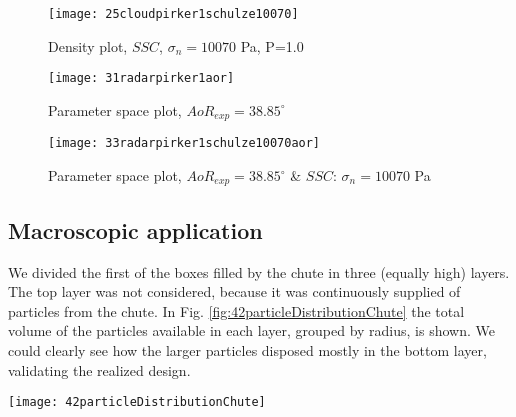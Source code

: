 \documentclass{CFD2015}
\begin{document}
\begin{figure}%
\centering 
\texttt{[image: 25cloudpirker1schulze10070]} 
\caption{Density plot, $SSC$, $\sigma_n=10070$ Pa, P=1.0}
\label{fig:25cloudpirker1schulze10070} 
\end{figure}
\begin{figure}%
\centering 
\texttt{[image: 31radarpirker1aor]} 
\caption{Parameter space plot, $AoR_{exp} = 38.85 ^\circ$}
\label{fig:31radarpirker1aor} 
\end{figure}
\begin{figure}%
\centering 
\texttt{[image: 33radarpirker1schulze10070aor]} 
\caption{Parameter space plot, $AoR_{exp} = 38.85
        ^\circ$ \& $SSC$: $\sigma_n=10070$ Pa}
\label{fig:33radarpirker1schulze10070aor} 
\end{figure}


\subsection{Macroscopic application}
\label{subsec:macroapplication}

We divided the first of the boxes filled by the chute in three (equally high)
layers.
The top layer was not considered, because it was continuously supplied of
particles from the chute.
In Fig. \ref{fig:42particleDistributionChute} the total volume of the particles
available in each layer, grouped by radius, is shown.
We could clearly see how the larger particles disposed mostly in the bottom
layer, validating the realized design.

\begin{figure*}%
\centering 
\texttt{[image: 42particleDistributionChute]} 
\caption{Distribution of particles in the box}
\label{fig:42particleDistributionChute} 
\end{figure*}

\end{document}
